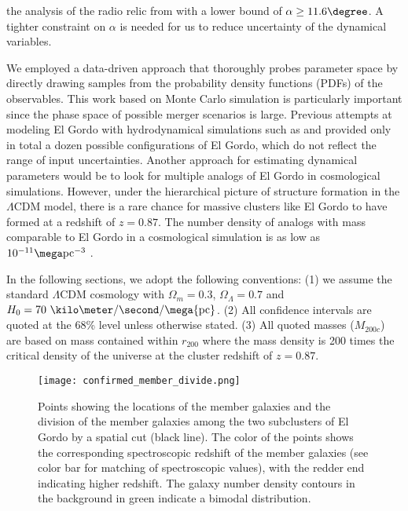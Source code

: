\documentclass[ucdthesis.tex]{subfiles}
\begin{document}
    the analysis of the radio relic from \cite{L13} with a lower bound of $\alpha \geq 11.6 \degree$. A tighter
    constraint on $\alpha$ is needed for us to reduce uncertainty of the
    dynamical variables. 
    \par 
    We employed a data-driven approach that thoroughly probes parameter
    space by directly drawing samples from the probability density functions
    (PDFs) of
    the observables. 
    This work based on Monte Carlo simulation is particularly important since
    the phase space of possible merger scenarios is large. Previous attempts at modeling El Gordo with hydrodynamical
    simulations such as \cite{Donnert13} and \cite{Molnar14} provided only in
    total a dozen possible configurations of El Gordo, which do not
    reflect the range of input uncertainties. Another approach for
    estimating dynamical parameters would be to look for multiple analogs of El Gordo in cosmological
    simulations.  However, under the hierarchical picture
    of structure formation in the $\Lambda$CDM model, there is a rare chance
    for massive clusters like El Gordo to have formed at a redshift of $z = 0.87$.  
    The number density of analogs with mass comparable to El Gordo in a
    cosmological simulation is as low as $10^{-11} \mega\text{pc}^{-3}$
    .\par
    In the following sections, we adopt the following conventions: (1) we
    assume the standard $\Lambda$CDM cosmology with $\Omega_{m} = 0.3$,
    $\Omega_{\Lambda} = 0.7$ and $H_0 = 70~\kilo\meter / \second / \mega
    {\rm pc}$. (2) All confidence intervals are quoted at the 68\% level unless otherwise stated. 
    (3) All quoted masses ($M_{200c}$) are based on mass contained
    within $r_{200}$ where the mass density is 200 times the critical density
    of the universe at the cluster redshift of $z = 0.87$. 
    \begin{figure}
    	\texttt{[image: confirmed\_member\_divide.png]}
    	\caption{\label{fig:membership} Points showing the locations of the
    	member galaxies and the division of the member galaxies among the two subclusters of El Gordo by a spatial cut
    (black line). The color of the points shows the corresponding spectroscopic
    redshift of the member galaxies (see color bar for matching of
    spectroscopic values), with the redder end indicating higher
    redshift. The galaxy number density contours in the background in green indicate a bimodal
    distribution.} 
    \end{figure}
\end{document}
